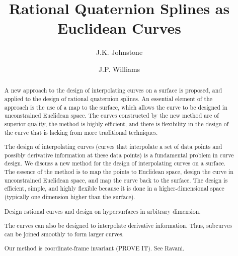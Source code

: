 \newif\ifFull
\Fullfalse

\SingleSpace

\setlength{\oddsidemargin}{0pt}
\setlength{\topmargin}{0in}	%
\setlength{\textheight}{8.5in}
\setlength{\textwidth}{6.5in}
\setlength{\columnsep}{5mm}		%



\title{Rational Quaternion Splines as Euclidean Curves}
\author{J.K. Johnstone \and J.P. Williams}


\maketitle

\begin{abstract}
A new approach to the design of interpolating curves on a surface
is proposed, and applied to the design of rational quaternion splines.
An essential element of the approach is the use of a map to the surface,
which allows the curve to be designed in unconstrained Euclidean space.
The curves constructed by the new method are of superior quality,
the method is highly efficient, and there is flexibility in the 
design of the curve that is lacking from more traditional techniques.

The design of interpolating curves (curves that interpolate a set of data
points and possibly derivative information at these data points)
is a fundamental problem in curve design.
We discuss a new method for the design of interpolating curves on a surface.
The essence of the method is to map the points to Euclidean space,
design the curve in unconstrained Euclidean space, 
and map the curve back to the surface.
The design is efficient, simple,
and highly flexible because it is done in a higher-dimensional
space (typically one dimension higher than the surface).

Design rational curves and
design on hypersurfaces in arbitrary dimension.

The curves can also be designed to interpolate derivative information.
Thus, subcurves can be joined smoothly to form larger curves.

Our method is coordinate-frame invariant (PROVE IT).  See Ravani.
\end{abstract}	

